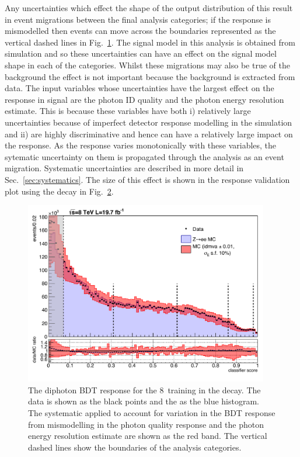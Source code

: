 \begin{figure}
  \label{fig:dipho_bdt}
\end{figure}

Any uncertainties which effect the shape of the output distribution of this \BDT result in event migrations between the final analysis categories; if the \BDT response is mismodelled then events can move across the boundaries represented as the vertical dashed lines in Fig.~\ref{fig:dipho_bdt}. The signal model in this analysis is obtained from \MC simulation and so these uncertainties can have an effect on the signal model shape in each of the categories. Whilst these migrations may also be true of the background the effect is not important because the background is extracted from data. The input variables whose uncertainties have the largest effect on the \BDT response in signal are the photon ID quality and the photon energy resolution estimate. This is because these variables have both i) relatively large uncertainties because of imperfect detector response modelling in the simulation and ii) are highly discriminative and hence can have a relatively large impact on the \BDT response. As the \BDT response varies monotonically with these variables, the sytematic uncertainty on them is propagated through the analysis as an event migration. Systematic uncertainties are described in more detail in Sec.~\ref{sec:systematics}. The size of this effect is shown in the \BDT response validation plot using the \Zee decay in Fig.~\ref{fig:diphotonBDT_zee}.

\begin{figure}
  \includegraphics[width=0.95\textwidth]{selec_and_cats/plots/transformedBDT_single_syst_fix.pdf}
  \caption[The diphoton \acs{BDT} response in \Zee decays]{The diphoton BDT response for the 8~\TeV training in the \Zee decay. The data is shown as the black points and the \MC as the blue histogram. The systematic applied to account for variation in the BDT response from mismodelling in the photon quality response and the photon energy resolution estimate are shown as the red band. The vertical dashed lines show the boundaries of the analysis categories.}
  \label{fig:diphotonBDT_zee}
\end{figure}


